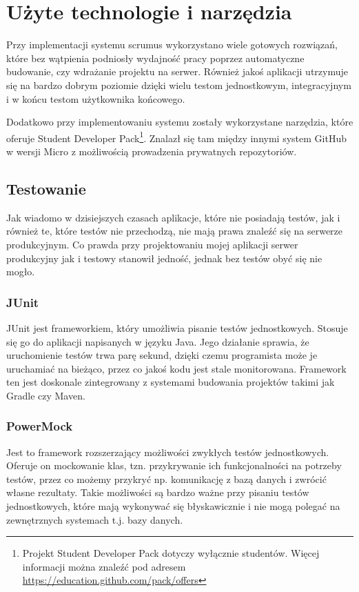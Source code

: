 \section{Użyte technologie i narzędzia}
Przy implementacji systemu scrumus wykorzystano wiele gotowych rozwiązań, które bez wątpienia podniosły wydajność pracy poprzez automatyczne budowanie, czy wdrażanie projektu na serwer. Również jakoś aplikacji utrzymuje się na bardzo dobrym poziomie dzięki wielu testom jednostkowym, integracyjnym i w końcu testom użytkownika końcowego. 

Dodatkowo przy implementowaniu systemu zostały wykorzystane narzędzia, które oferuje Student Developer Pack\footnote{Projekt Student Developer Pack dotyczy wyłącznie studentów. Więcej informacji można znaleźć pod adresem \url{https://education.github.com/pack/offers}}. Znalazł się tam między innymi system GitHub w wersji Micro z możliwością prowadzenia prywatnych repozytoriów.

\subsection{Testowanie}
Jak wiadomo w dzisiejszych czasach aplikacje, które nie posiadają testów, jak i również te, które testów nie przechodzą, nie mają prawa znaleźć się na serwerze produkcyjnym. Co prawda przy projektowaniu mojej aplikacji serwer produkcyjny jak i testowy stanowił jedność, jednak bez testów obyć się nie mogło.

\subsubsection{JUnit}
JUnit jest frameworkiem, który umożliwia pisanie testów jednostkowych. Stosuje się go do aplikacji napisanych w języku Java. Jego działanie sprawia, że uruchomienie testów trwa parę sekund, dzięki czemu programista może je uruchamiać na bieżąco, przez co jakoś kodu jest stale monitorowana. Framework ten jest doskonale zintegrowany z systemami budowania projektów takimi jak Gradle czy Maven. 

\subsubsection{PowerMock}
Jest to framework rozszerzający możliwości zwykłych testów jednostkowych. Oferuje on mockowanie klas, tzn. przykrywanie ich funkcjonalności na potrzeby testów, przez co możemy przykryć np. komunikację z bazą danych i zwrócić własne rezultaty. Takie możliwości są bardzo ważne przy pisaniu testów jednostkowych, które mają wykonywać się błyskawicznie i nie mogą polegać na zewnętrznych systemach t.j. bazy danych.


